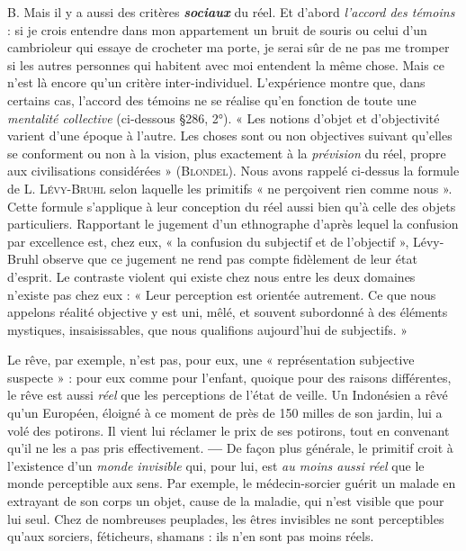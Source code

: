 B. Mais il y a aussi des critères \textbf{\textit {sociaux}} du réel. Et d’abord {\it l'accord
des témoins} : si je crois entendre dans mon appartement un bruit de
souris ou celui d’un cambrioleur qui essaye de crocheter ma porte,
je serai sûr de ne pas me tromper si les autres personnes qui habitent
avec moi entendent la même chose. Mais ce n’est là encore qu’un
critère inter-individuel. L'expérience montre que, dans certains cas,
l'accord des témoins ne se réalise qu’en fonction de toute une {\it mentalité
collective} (ci-dessous \S 286, 2°). « Les notions d’objet et d’objectivité
varient d’une époque à l’autre. Les choses sont ou non objectives
suivant qu’elles se conforment ou non à la vision, plus exactement à
la {\it prévision} du réel, propre aux civilisations considérées » (\textsc{Blondel}).
Nous avons rappelé ci-dessus la formule de L. \textsc{Lévy-Bruhl} selon
laquelle les primitifs « ne perçoivent rien comme nous ». Cette formule
s’applique à leur conception du réel aussi bien qu’à celle des
objets particuliers. Rapportant le jugement d’un ethnographe d’après
lequel la confusion par excellence est, chez eux, « la confusion du
subjectif et de l'objectif », Lévy-Bruhl observe que ce jugement ne
rend pas compte fidèlement de leur état d'esprit. Le contraste violent
qui existe chez nous entre les deux domaines n’existe pas chez
eux : « Leur perception est orientée autrement. Ce que nous appelons
réalité objective y est uni, mêlé, et souvent subordonné à des éléments
mystiques, insaisissables, que nous qualifions aujourd’hui de
subjectifs. »

Le rêve, par exemple, n’est pas, pour eux, une « représentation subjective
suspecte » : pour eux comme pour l'enfant, quoique pour des raisons différentes,
le rêve est aussi {\it réel} que les perceptions de l’état de veille. Un
Indonésien a rêvé qu’un Européen, éloigné à ce moment de près de 150 milles
de son jardin, lui a volé des potirons. Il vient lui réclamer le prix de ses
potirons, tout en convenant qu’il ne les a pas pris effectivement. {\bf —} De façon
plus générale, le primitif croit à l'existence d’un \textsf{\textit {monde invisible}} qui, pour lui,
est {\it au moins aussi réel} que le monde perceptible aux sens. Par exemple,
le médecin-sorcier guérit un malade en extrayant de son corps un objet,
cause de la maladie, qui n’est visible que pour lui seul. Chez de nombreuses
peuplades, les êtres invisibles ne sont perceptibles qu’aux sorciers, féticheurs,
shamans : ils n’en sont pas moins réels.

